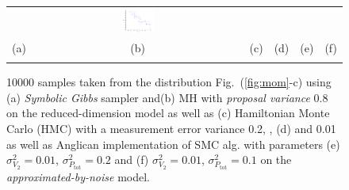 \documentclass[letterpaper]{article}
\newcommand{\nn}{0.16}
\begin{document}
\begin{figure}[t!]
\begin{center}
\begin{tabular}{cccccc}
& \hspace{-3mm} \includegraphics[width=\nn\textwidth]{Figs2/col_c_ang_10000_01_001}
\vspace{-1.5mm}
\\
   \hspace{-4mm} \footnotesize(a) 
& \hspace{-2mm} \footnotesize(b) 
& \hspace{-3mm} \footnotesize(c) 
&\hspace{-1mm} \footnotesize(d) 
&\hspace{-1mm} \footnotesize(e) 
&\hspace{-1mm} \footnotesize(f)\\
\multicolumn{6}{c}{}
\end{tabular}
\end{center}
\vspace{-8mm}
\caption{\footnotesize
10000 samples taken from the distribution Fig.~(\ref{fig:mom}-c)
using (a) \emph{Symbolic Gibbs} sampler and(b) MH with \emph{proposal variance} 0.8 
on the reduced-dimension model as well as  
(c) Hamiltonian Monte Carlo (HMC) with a measurement error variance 0.2, 
, (d) and 0.01 as well as Anglican implementation of SMC alg. with %
parameters (e)
$\sigma^2_{V_2} = 0.01$, $\sigma^2_{P_\text{tot}} = 0.2$ and 
(f) $\sigma^2_{V_2} = 0.01$, $\sigma^2_{P_\text{tot}} = 0.1$
on the \emph{approximated-by-noise} model.
}
\label{fig:mom2}
\vspace{-4mm}
\end{figure}
\end{document}
